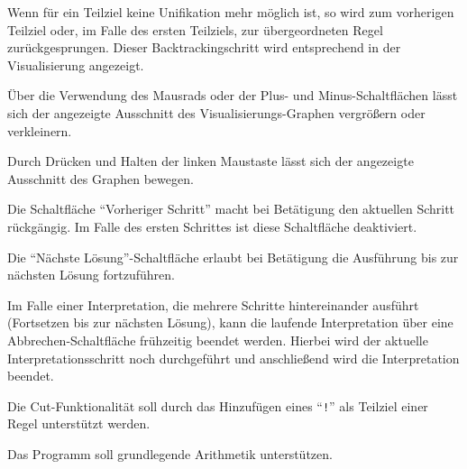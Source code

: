\documentclass[parskip=full,11pt,twoside]{scrartcl}
\begin{document}
Wenn für ein Teilziel keine Unifikation mehr möglich ist, so wird zum vorherigen Teilziel oder, im Falle des ersten Teilziels, zur übergeordneten Regel zurückgesprungen. Dieser Backtrackingschritt wird entsprechend in der Visualisierung angezeigt.


Über die Verwendung des Mausrads oder der Plus- und Minus-Schaltflächen lässt sich der angezeigte Ausschnitt des Visualisierungs-Graphen vergrößern oder verkleinern.


Durch Drücken und Halten der linken Maustaste lässt sich der angezeigte Ausschnitt des Graphen bewegen.


Die Schaltfläche \enquote{Vorheriger Schritt} macht bei Betätigung den aktuellen Schritt rückgängig. Im Falle des ersten Schrittes ist diese Schaltfläche deaktiviert.


Die \enquote{Nächste Lösung}-Schaltfläche erlaubt bei Betätigung die Ausführung bis zur nächsten Lösung fortzuführen.


Im Falle einer Interpretation, die mehrere Schritte hintereinander ausführt (Fortsetzen bis zur nächsten Lösung), kann die laufende Interpretation über eine Abbrechen-Schaltfläche frühzeitig beendet werden. Hierbei wird der aktuelle Interpretationsschritt noch durchgeführt und anschließend wird die Interpretation beendet.


Die Cut-Funktionalität soll durch das Hinzufügen eines \enquote{\texttt{!}} als Teilziel einer Regel unterstützt werden.


Das Programm soll grundlegende Arithmetik unterstützen.

\end{document}
